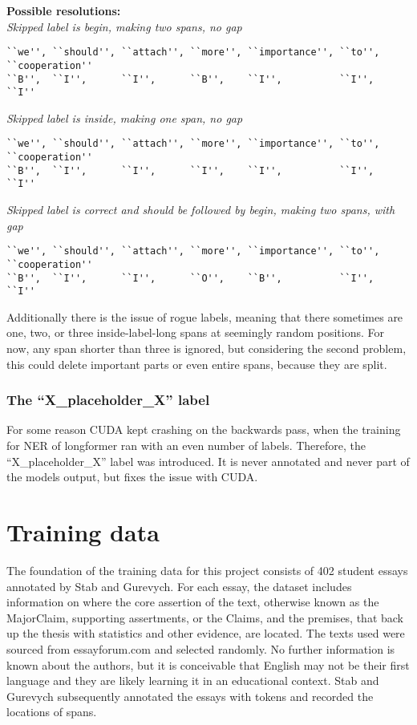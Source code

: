 \documentclass[12]{article}
\theoremstyle{mytheoremstyle}
\theoremstyle{mytheoremstyle}
\theoremstyle{myproblemstyle}
\begin{document}
  \vspace{-4ex}
  \textbf{Possible resolutions:}\\
  \textit{Skipped label is begin, making two spans, no gap}
  \vspace{-1.5ex}
  \begin{verbatim}
``we'', ``should'', ``attach'', ``more'', ``importance'', ``to'', ``cooperation''
``B'',  ``I'',      ``I'',      ``B'',    ``I'',          ``I'',  ``I''
  \end{verbatim}
  \vspace{-4ex}
  \textit{Skipped label is inside, making one span, no gap}
  \vspace{-1.5ex}
  \begin{verbatim}
``we'', ``should'', ``attach'', ``more'', ``importance'', ``to'', ``cooperation''
``B'',  ``I'',      ``I'',      ``I'',    ``I'',          ``I'',  ``I''
  \end{verbatim}
  \vspace{-4ex}
  \textit{Skipped label is correct and should be followed by begin, making two spans, with gap}
  \vspace{-1.5ex}
  \begin{verbatim}
``we'', ``should'', ``attach'', ``more'', ``importance'', ``to'', ``cooperation''
``B'',  ``I'',      ``I'',      ``O'',    ``B'',          ``I'',  ``I''
  \end{verbatim}
  \vspace{-4ex}
  Additionally there is the issue of rogue labels, meaning that there sometimes are one, two, or three inside-label-long spans at seemingly random positions. 
  For now, any span shorter than three is ignored, but considering the second problem, this could delete important parts or even entire spans, because they are split.
  \subsubsection{The ``X\_placeholder\_X'' label} \label{the placeholder label}
  For some reason CUDA kept crashing on the backwards pass, when the training for NER of longformer ran with an even number of labels. 
  Therefore, the ``X\_placeholder\_X'' label was introduced. 
  It is never annotated and never part of the models output, but fixes the issue with CUDA.
  \section{Training data\dotfill}
  The foundation of the training data for this project consists of 402 student essays annotated by Stab and Gurevych. For each essay, the dataset includes information on where the core assertion of the text, otherwise known as the MajorClaim, supporting assertments, or the Claims, and the premises, that back up the thesis with statistics and other evidence, are located. 
  The texts used were sourced from essayforum.com and selected randomly. No further information is known about the authors, but it is conceivable that English may not be their first language and they are likely learning it in an educational context.
  Stab and Gurevych subsequently annotated the essays with tokens and recorded the locations of spans.
\end{document}
